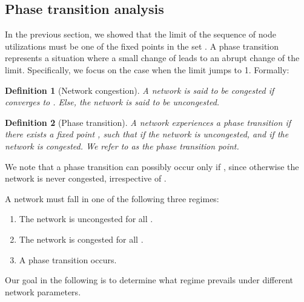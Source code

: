 \documentclass{IEEEtran}
\newtheorem{definition}{Definition}
\begin{document}
\subsection{Phase transition analysis}
\label{The phase transition phenomenon}
In the previous section, we showed that the limit of the sequence of node utilizations  must be one of the fixed points in the
set .  A phase transition represents a situation where a small change of  leads to an abrupt  change of the limit. Specifically, we
focus on the case when the limit jumps to 1. Formally:
\begin{definition}[Network congestion] A network is said to be \textit{congested} if  converges to . Else, the network is
said to be \textit{uncongested}.
\end{definition}
\begin{definition}
[Phase transition] A network experiences a phase transition if there exists a fixed point , such that if
 the network is uncongested, and if  the network is congested. We refer to  as the phase transition point.
\end{definition}
We note that a phase transition can possibly occur only if , since otherwise the network is never  congested, irrespective of .




A network must fall in one of the following  three regimes:
\begin{enumerate}
\item The network is uncongested for all .
\item The network is congested for all .
\item A phase transition occurs.
\end{enumerate}
Our goal in the following is to determine what regime prevails under different network parameters.
\end{document}
